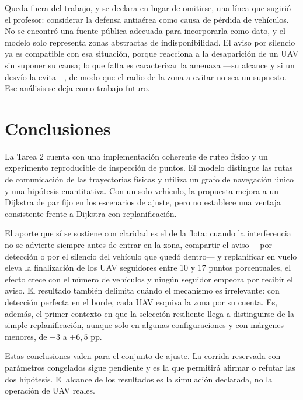 \documentclass[journal,10pt]{IEEEtran}
\begin{document}
Queda fuera del trabajo, y se declara en lugar de omitirse, una línea que
sugirió el profesor: considerar la defensa antiaérea como causa de pérdida
de vehículos. No se encontró una fuente pública adecuada para incorporarla
como dato, y el modelo solo representa zonas abstractas de indisponibilidad.
El aviso por silencio ya es compatible con esa situación, porque reacciona a
la desaparición de un UAV sin suponer su causa; lo que falta es caracterizar
la amenaza ---su alcance y si un desvío la evita---, de modo que el radio de
la zona a evitar no sea un supuesto. Ese análisis se deja como trabajo
futuro.

\section{Conclusiones}

La Tarea 2 cuenta con una implementación coherente de ruteo físico y un
experimento reproducible de inspección de puntos. El modelo distingue las
rutas de comunicación de las trayectorias físicas y utiliza un grafo de
navegación único y una hipótesis cuantitativa. Con un solo vehículo, la
propuesta mejora a un Dijkstra de par fijo en los escenarios de ajuste, pero
no establece una ventaja consistente frente a Dijkstra con replanificación.

El aporte que sí se sostiene con claridad es el de la flota: cuando la
interferencia no se advierte siempre antes de entrar en la zona, compartir
el aviso ---por detección o por el silencio del vehículo que quedó
dentro--- y replanificar en vuelo eleva la finalización de los UAV
seguidores entre 10 y 17 puntos porcentuales, el efecto crece con el número
de vehículos y ningún seguidor empeora por recibir el aviso. El resultado
también delimita cuándo el mecanismo es irrelevante: con detección perfecta
en el borde, cada UAV esquiva la zona por su cuenta. Es, además, el primer
contexto en que la selección resiliente llega a distinguirse de la simple
replanificación, aunque solo en algunas configuraciones y con márgenes
menores, de $+3$ a $+6{,}5$ pp.

Estas conclusiones valen para el conjunto de ajuste. La corrida reservada
con parámetros congelados sigue pendiente y es la que permitirá afirmar o
refutar las dos hipótesis. El alcance de los resultados es la simulación
declarada, no la operación de UAV reales.
\end{document}
